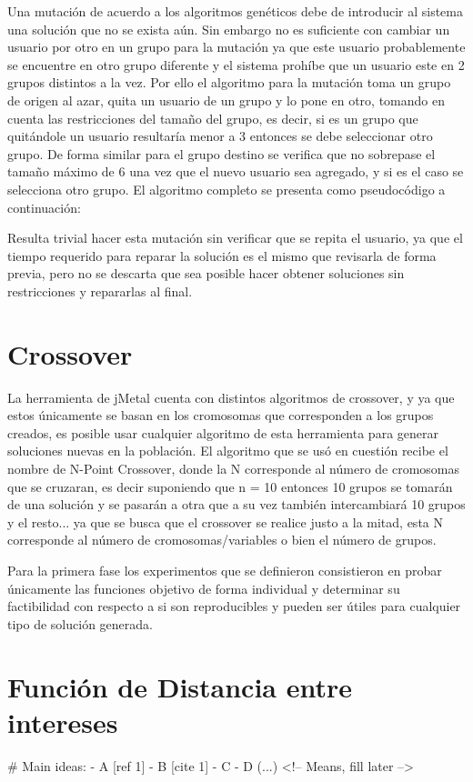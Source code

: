 Una mutación de acuerdo a los algoritmos genéticos debe de introducir al sistema una solución que no se exista aún. Sin embargo no es suficiente con cambiar un usuario por otro en un grupo para la mutación ya que este usuario probablemente se encuentre en otro grupo diferente y el sistema prohíbe que un usuario este en 2 grupos distintos a la vez. Por ello el algoritmo para la mutación toma un grupo de origen al azar, quita un usuario de un grupo y lo pone en otro, tomando en cuenta las restricciones del tamaño del grupo, es decir, si es un grupo que quitándole un usuario resultaría menor a 3 entonces se debe seleccionar otro grupo. De forma similar para el grupo destino se verifica que no sobrepase el tamaño máximo de 6 una vez que el nuevo usuario sea agregado, y si es el caso se selecciona otro grupo. El algoritmo completo se presenta como pseudocódigo a continuación:

Resulta trivial hacer esta mutación sin verificar que se repita el usuario, ya que el tiempo requerido para reparar la solución es el mismo que revisarla de forma previa, pero no se descarta que sea posible hacer obtener soluciones sin restricciones y repararlas al final.

\section{Crossover}

La herramienta de jMetal cuenta con distintos algoritmos de crossover, y ya que estos únicamente se basan en los cromosomas que corresponden a los grupos creados, es posible usar cualquier algoritmo de esta herramienta para generar soluciones nuevas en la población. El algoritmo que se usó en cuestión recibe el nombre de N-Point Crossover, donde la N corresponde al número de cromosomas que se cruzaran, es decir suponiendo que n = 10 entonces 10 grupos se tomarán de una solución y se pasarán a otra que a su vez también intercambiará 10 grupos y el resto... ya que se busca que el crossover se realice justo a la mitad, esta N corresponde al número de cromosomas/variables o bien el número de grupos.

Para la primera fase los experimentos que se definieron consistieron en probar únicamente las funciones objetivo de forma individual y determinar su factibilidad con respecto a si son reproducibles y pueden ser útiles para cualquier tipo de solución generada.

\section{Función de Distancia entre intereses}
# Main ideas:
- A [ref 1]
- B [cite 1]
- C
- D (...) <!-- Means, fill later -->

